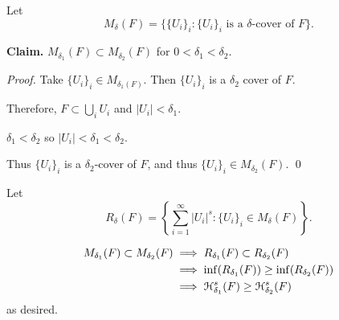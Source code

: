 Let \[M_\delta(F) = \{\{U_i\}_i : \{U_i\}_i \text{ is a } \delta\text{-cover of } F\}.\]

\textbf{Claim.} \(M_{\delta_1}(F) \subset M_{\delta_2}(F)\) for \(0 < \delta_1 < \delta_2\).

\textit{Proof.} Take \({\{U_i\}_i} \in M_{\delta_1(F)}\). Then \(\{U_i\}_i\) is a \(\delta_2\) cover of \(F\).

Therefore, \(F \subset \bigcup_i U_i\) and \(|U_i| < \delta_1\).

\(\delta_1 < \delta_2\) so \(|U_i| < \delta_1 < \delta_2\).

Thus \(\{U_i\}_i\) is a \(\delta_2\)-cover of \(F\), and thus \(\{U_i\}_i \in M_{\delta_2}(F)\). \qed

Let
\[R_\delta(F) = \left\{\sum_{i=1}^\infty |U_i|^s: \{U_i\}_i \in M_\delta(F)\right\}.\]

\begin{align*}
    M_{\delta_1}(F) \subset M_{\delta_2}(F) &\implies R_{\delta_1}(F) \subset R_{\delta_2}(F)\\
    &\implies \inf(R_{\delta_1}(F)) \geq \inf(R_{\delta_2}(F))\\
    &\implies \mathcal{H}_{\delta_1}^s(F) \geq \mathcal{H}_{\delta_2}^s(F)
\end{align*}
as desired.